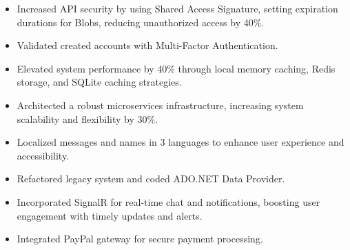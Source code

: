 


\smallskip
\begin{itemize}
    \item Increased API security by using Shared Access Signature, setting expiration durations for Blobs, reducing unauthorized access by 40\%.
    \item Validated created accounts with Multi-Factor Authentication.
    \item Elevated system performance by 40\% through local memory caching, Redis storage, and SQLite caching strategies.
    \item Architected a robust microservices infrastructure, increasing system scalability and flexibility by 30\%.
    \item Localized messages and names in 3 languages to enhance user experience and accessibility.
    \item Refactored legacy system and coded ADO.NET Data Provider.
    \item Incorporated SignalR for real-time chat and notifications, boosting user engagement with timely updates and alerts.
    \item Integrated PayPal gateway for secure payment processing.
\end{itemize}